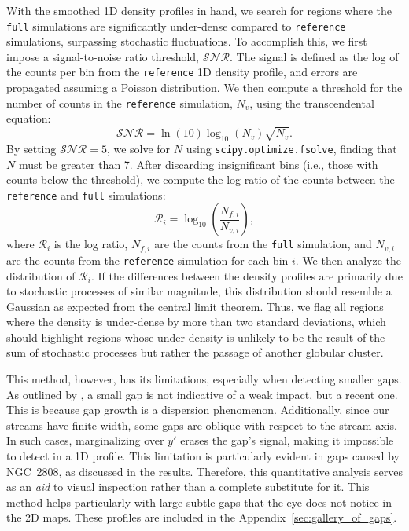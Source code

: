 \documentclass[draft]{aa}
\begin{document}
\begin{appendix}
    With the smoothed 1D density profiles in hand, we search for regions where the \texttt{full} simulations are significantly under-dense compared to \texttt{reference} simulations, surpassing stochastic fluctuations. To accomplish this, we first impose a signal-to-noise ratio threshold, $\mathcal{SNR}$. The signal is defined as the log of the counts per bin from the \texttt{reference} 1D density profile, and errors are propagated assuming a Poisson distribution. We then compute a threshold for the number of counts in the \texttt{reference} simulation, $N_v$, using the transcendental equation:
    \begin{equation}
        \mathcal{SNR} = \ln(10) \log_{10}\left(N_v\right) \sqrt{N_v}.
      \end{equation} \label{eq:density_threshold}
    By setting $\mathcal{SNR} = 5$, we solve for $N$ using \texttt{scipy.optimize.fsolve}, finding that $N$ must be greater than 7. After discarding insignificant bins (i.e., those with counts below the threshold), we compute the log ratio of the counts between the \texttt{reference} and \texttt{full} simulations:
    \begin{equation}
        \mathcal{R}_i = \log_{10}\left(\frac{N_{f,i}}{N_{v,i}}\right),
      \end{equation}
    where $\mathcal{R}_i$ is the log ratio, $N_{f,i}$ are the counts from the \texttt{full} simulation, and $N_{v,i}$ are the counts from the \texttt{reference} simulation for each bin $i$. We then analyze the distribution of $\mathcal{R}_i$. If the differences between the density profiles are primarily due to stochastic processes of similar magnitude, this distribution should resemble a Gaussian as expected from the central limit theorem. Thus, we flag all regions where the density is under-dense by more than two standard deviations, which should highlight regions whose under-density is unlikely to be the result of the sum of stochastic processes but rather the passage of another globular cluster. 

    This method, however, has its limitations, especially when detecting smaller gaps. As outlined by \citet{2015MNRAS.450.1136E}, a small gap is not indicative of a weak impact, but a recent one. This is because gap growth is a dispersion phenomenon. Additionally, since our streams have finite width, some gaps are oblique with respect to the stream axis. In such cases, marginalizing over $y'$ erases the gap's signal, making it impossible to detect in a 1D profile. This limitation is particularly evident in gaps caused by NGC~2808, as discussed in the results. Therefore, this quantitative analysis serves as an \textit{aid} to visual inspection rather than a complete substitute for it. This method helps particularly with large subtle gaps that the eye does not notice in the 2D maps. These profiles are included in the Appendix~\ref{sec:gallery_of_gaps}.



\end{appendix}
\end{document}
